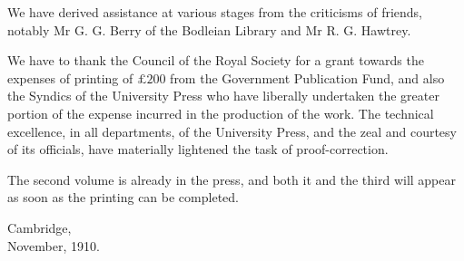 \documentclass[10pt]{article}
\begin{document}
We have derived assistance at various stages from the criticisms of friends, notably Mr G. G. Berry of the Bodleian Library and Mr R. G. Hawtrey.

We have to thank the Council of the Royal Society for a grant towards the expenses of printing of $\pounds 200$ from the Government Publication Fund, and also the Syndics of the University Press who have liberally undertaken the greater portion of the expense incurred in the production of the work. The technical excellence, in all departments, of the University Press, and the zeal and courtesy of its officials, have materially lightened the task of proof-correction.

The second volume is already in the press, and both it and the third will appear as soon as the printing can be completed.

Cambridge,\\
November, 1910.
\end{document}
